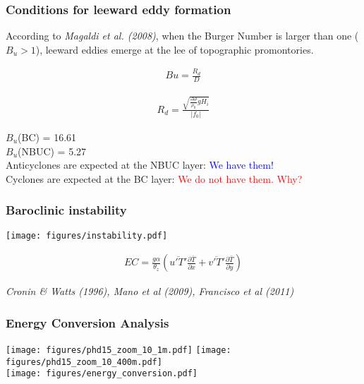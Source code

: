 \documentclass{beamer}
\begin{document}
\frame
{
  \frametitle{Conditions for leeward eddy formation}

\begin{footnotesize}
According to {\it Magaldi et al. (2008)}, when the Burger Number is larger than one ($B_u > 1$), 
leeward eddies emerge at the lee of topographic promontories. 

\begin{eqnarray*}
    Bu = \frac{R_d}{D}
    \label{eq:burger}
\end{eqnarray*}

\begin{eqnarray*}
    R_d = \frac{ \sqrt{ \frac{\Delta \rho}{\rho_0} g H_i} } {|f_0|}
    \label{eq:rd}
\end{eqnarray*}

$B_u$(BC) = 16.61\\
$B_u$(NBUC) = 5.27\\
Anticyclones are expected at the NBUC layer: \textcolor{blue}{We have them!}\\
Cyclones are expected at the BC layer: \textcolor{red}{We do not have them. Why?}

\end{footnotesize}
}


\frame
{
  \frametitle{Baroclinic instability}
\begin{center}
\texttt{[image: figures/instability.pdf]}
\end{center}
\begin{small}
\begin{eqnarray*}
EC = \frac{g\alpha}{\theta_z} \left( \overline{u'T'} \frac{\partial\bar{T}}{\partial x} + 
                                     \overline{v'T'} \frac{\partial\bar{T}}{\partial y}  \right )
\label{eq:bc_conversion}
\end{eqnarray*}

{\it Cronin \& Watts (1996), Mano et al (2009), Francisco et al (2011)}
\end{small}
}


\frame
{
  \frametitle{Energy Conversion Analysis}
\begin{center}
\texttt{[image: figures/phd15\_zoom\_10\_1m.pdf]}
\texttt{[image: figures/phd15\_zoom\_10\_400m.pdf]}\\
\texttt{[image: figures/energy\_conversion.pdf]}
\end{center}
}
\end{document}
